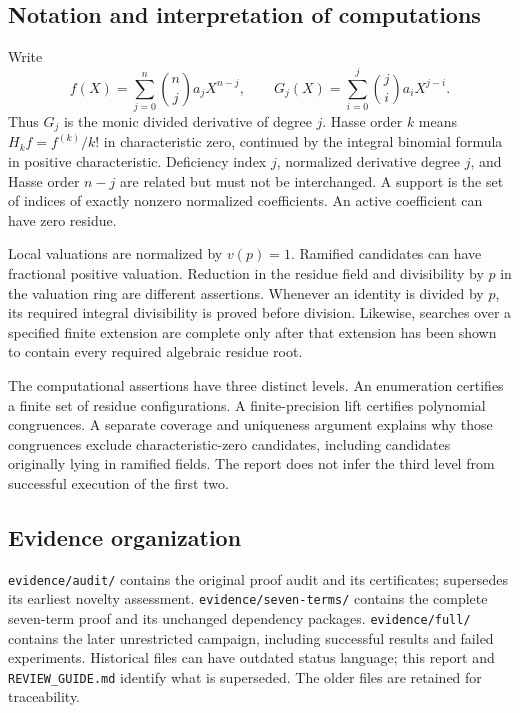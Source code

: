 \documentclass[
  british,
  10pt,
]{article}
\begin{document}
\subsection{Notation and interpretation of
computations}\label{notation-and-interpretation-of-computations}

Write \[f(X)=\sum_{j=0}^{n}\binom nj a_jX^{n-j},\qquad
G_j(X)=\sum_{i=0}^{j}\binom ji a_iX^{j-i}.\] Thus \(G_j\) is the monic
divided derivative of degree \(j\). Hasse order \(k\) means
\(H_kf=f^{(k)}/k!\) in characteristic zero, continued by the integral
binomial formula in positive characteristic. Deficiency index \(j\),
normalized derivative degree \(j\), and Hasse order \(n-j\) are related
but must not be interchanged. A support is the set of indices of exactly
nonzero normalized coefficients. An active coefficient can have zero
residue.

Local valuations are normalized by \(v(p)=1\). Ramified candidates can
have fractional positive valuation. Reduction in the residue field and
divisibility by \(p\) in the valuation ring are different assertions.
Whenever an identity is divided by \(p\), its required integral
divisibility is proved before division. Likewise, searches over a
specified finite extension are complete only after that extension has
been shown to contain every required algebraic residue root.

The computational assertions have three distinct levels. An enumeration
certifies a finite set of residue configurations. A finite-precision
lift certifies polynomial congruences. A separate coverage and
uniqueness argument explains why those congruences exclude
characteristic-zero candidates, including candidates originally lying in
ramified fields. The report does not infer the third level from
successful execution of the first two.

\subsection{Evidence organization}\label{evidence-organization}

\texttt{evidence/audit/} contains the original proof audit and its
certificates;  supersedes its
earliest novelty assessment. \texttt{evidence/seven-terms/} contains the
complete seven-term proof and its unchanged dependency packages.
\texttt{evidence/full/} contains the later unrestricted campaign,
including successful results and failed experiments. Historical files
can have outdated status language; this report and
\texttt{REVIEW\_GUIDE.md} identify what is superseded. The older files
are retained for traceability.
\end{document}
